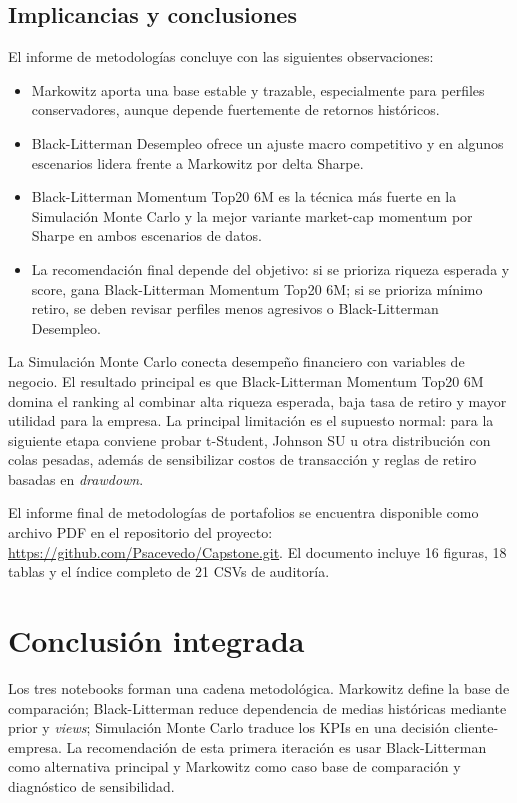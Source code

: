 \subsection*{Implicancias y conclusiones}

El informe de metodolog\'ias concluye con las siguientes observaciones:

\begin{itemize}
    \item Markowitz aporta una base estable y trazable, especialmente para
    perfiles conservadores, aunque depende fuertemente de retornos hist\'oricos.
    \item Black-Litterman Desempleo ofrece un ajuste macro competitivo y en
    algunos escenarios lidera frente a Markowitz por delta Sharpe.
    \item Black-Litterman Momentum Top20 6M es la t\'ecnica m\'as fuerte en la
    Simulaci\'on Monte Carlo y la mejor variante market-cap momentum por Sharpe
    en ambos escenarios de datos.
    \item La recomendaci\'on final depende del objetivo: si se prioriza riqueza
    esperada y score, gana Black-Litterman Momentum Top20 6M; si se prioriza
    m\'inimo retiro, se deben revisar perfiles menos agresivos o
    Black-Litterman Desempleo.
\end{itemize}

La Simulaci\'on Monte Carlo conecta desempe\~no financiero con variables de
negocio. El resultado principal es que Black-Litterman Momentum Top20 6M domina
el ranking al combinar alta riqueza esperada, baja tasa de retiro y mayor
utilidad para la empresa. La principal limitaci\'on es el supuesto normal: para
la siguiente etapa conviene probar t-Student, Johnson SU u otra distribuci\'on
con colas pesadas, adem\'as de sensibilizar costos de transacci\'on y reglas de
retiro basadas en \textit{drawdown}.

El informe final de metodolog\'ias de portafolios se encuentra disponible como
archivo PDF en el repositorio del proyecto:
\url{https://github.com/Psacevedo/Capstone.git}. El documento incluye
16 figuras, 18 tablas y el \'indice completo de 21 CSVs de auditor\'ia.

\section*{Conclusi\'on integrada}

Los tres notebooks forman una cadena metodol\'ogica. Markowitz define la base de
comparaci\'on; Black-Litterman reduce dependencia de medias hist\'oricas mediante
prior y \textit{views}; Simulaci\'on Monte Carlo traduce los KPIs en una decisi\'on
cliente-empresa. La recomendaci\'on de esta primera iteraci\'on es usar
Black-Litterman como alternativa principal y Markowitz como caso base de
comparaci\'on y diagn\'ostico de sensibilidad.
